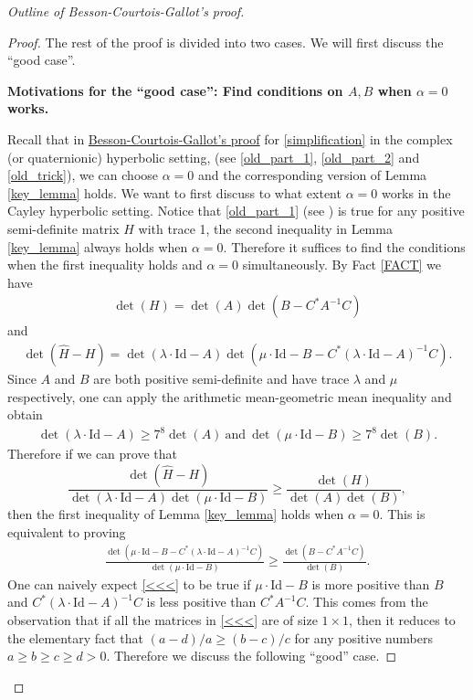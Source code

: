\documentclass{article}
\newcommand{\id}{\mathrm{Id}}
\theoremstyle{definition}
\begin{document}
\begin{proof}[Outline of Besson-Courtois-Gallot's proof]
\begin{proof}
The rest of the proof is divided into two cases. We will first discuss the ``good case''.

\textbf{Motivations for the ``good case'': Find conditions on $A,B$ when $\alpha=0$ works.} 

Recall that in \hyperlink{BCG's proof sketch}{Besson-Courtois-Gallot's proof} for \eqref{simplification} in the complex (or quaternionic) hyperbolic setting, (see \eqref{old_part_1}, \eqref{old_part_2} and \eqref{old_trick}), we can choose $\alpha=0$ and the corresponding version of Lemma \ref{key_lemma} holds. We want to first discuss to what extent $\alpha=0$ works in the Cayley hyperbolic setting. Notice that \eqref{old_part_1} (see \cite[B.4 Lemme]{BCG1}) is true for any positive semi-definite matrix $H$ with trace 1, the second inequality in Lemma \ref{key_lemma} always holds when $\alpha=0$. Therefore it suffices to find the conditions when the first inequality holds and $\alpha=0$ simultaneously. By Fact \ref{FACT} we have
\begin{align}\label{H_det_decomp}
\det(H)=\det(A)\det(B-C^*A^{-1}C)
\end{align}
and 
\begin{align}\label{hatH-H_det_decomp}
\det(\widehat H-H)=\det(\lambda\cdot\id-A)\det(\mu\cdot\id-B-C^*(\lambda\cdot\id-A)^{-1}C).
\end{align}
Since $A$ and $B$ are both positive semi-definite and have trace $\lambda$ and $\mu$ respectively, one can apply the arithmetic mean-geometric mean inequality and obtain
\begin{align}\label{am_gm_good}\det(\lambda\cdot\id-A)\geq 7^8\det(A)\mathrm{~and~}\det(\mu\cdot\id-B)\geq 7^8\det(B).\end{align}
Therefore if we can prove that
$$\frac{\det(\widehat H-H)}{\det(\lambda\cdot\id-A)\det(\mu\cdot\id-B)}\geq\frac{\det(H)}{\det(A)\det(B)},$$
then the first inequality of Lemma \ref{key_lemma} holds when $\alpha=0$. This is equivalent to proving
\begin{align}\label{<<<}  
\frac{\det(\mu\cdot\id-B-C^*(\lambda\cdot\id-A)^{-1}C)}{\det(\mu\cdot\id-B)}\geq\frac{\det(B-C^*A^{-1}C)}{\det(B)}.
\end{align}
One can naively expect \eqref{<<<} to be true if $\mu\cdot\id-B$ is more positive than $B$ and $C^*(\lambda\cdot\id-A)^{-1}C$ is less positive than $C^*A^{-1}C$. This comes from the observation that if all the matrices in \eqref{<<<} are of size $1\times 1$, then it reduces to the elementary fact that $(a-d)/a\geq (b-c)/c$ for any positive numbers $a\geq b\geq c\geq d>0$. Therefore we discuss the following ``good'' case.


\end{proof}
\end{proof}
\end{document}
